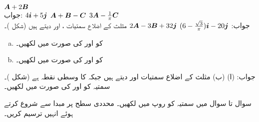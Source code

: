 ${{\boldsymbol{A}}}+2{{\boldsymbol{B}}}$\\
جواب:\quad
$4{\boldsymbol{i}}+5{\boldsymbol{j}}$
${{\boldsymbol{A}}}+{{\boldsymbol{B}}}-{{\boldsymbol{C}}}$
$3{{\boldsymbol{A}}}-\frac{1}{\pi}{{\boldsymbol{C}}}$\\
جواب:\quad
$(6-\tfrac{\sqrt{3}}{\pi}){\boldsymbol{i}}-20{\boldsymbol{j}}$
$2{{\boldsymbol{A}}}-3{{\boldsymbol{B}}}+32{\boldsymbol{j}}$
مثلث   کے اضلاع سمتیات ،  اور  دیتے ہیں (شکل )۔
\begin{enumerate}[a.]
\item
{} کو  اور  کی صورت میں لکھیں۔
\item
{} کو  اور  کی صورت میں لکھیں۔
\end{enumerate}
جواب:\quad
(ا)  (ب) 
مثلث  کے اضلاع  سمتیات  اور  دیتے ہیں جبکہ  کا وسطی نقطہ  ہے (شکل )۔ سمتیہ  کو  اور  کی صورت میں لکھیں۔

سوال  تا سوال  میں سمتیہ کو  روپ میں لکھیں۔ محددی سطح پر مبدا سے شروع کرتے ہوئے  انہیں ترسیم کریں۔

